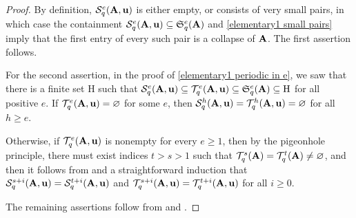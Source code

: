 \documentclass{article}
\begin{document}
\begin{proof}
By definition, $\mathcal{S}_{q}^e(\mathbf{A}, \mathbf{u})$ is either empty, or consists of very small pairs, in which case the containment $\mathcal{S}_{q}^e(\mathbf{A}, \mathbf{u}) \subseteq \mathfrak{S}_{q}^e(\mathbf{A})$ and    \ref{elementary1 small pairs} imply that the first entry of every such pair is a collapse of $\mathbf{A}$.   The first assertion follows.

For the second assertion, in the proof of \ref{elementary1 periodic in e}, we saw that there is a finite set $\mathrm{H}$ such that $\mathcal{S}_{q}^e(\mathbf{A}, \mathbf{u}) \subseteq \mathcal{T}_{q}^e(\mathbf{A}, \mathbf{u}) \subseteq \mathfrak{S}_{q}^e(\mathbf{A}) \subseteq \mathrm{H}$ for all positive $e$.  If $\mathcal{T}_{q}^e(\mathbf{A}, \mathbf{u}) = \varnothing$ for some $e$, then $\mathcal{S}_{q}^h(\mathbf{A}, \mathbf{u}) = \mathcal{T}_{q}^h(\mathbf{A}, \mathbf{u}) = \varnothing$ for all $h \geq e$.  

Otherwise, if $\mathcal{T}_{q}^e(\mathbf{A}, \mathbf{u})$ is nonempty for every $e \geq 1$, then by the pigeonhole principle, there must exist indices $t > s > 1$ such that $\mathcal{T}_{q}^s(\mathbf{A}) = \mathcal{T}_{q}^t(\mathbf{A}) \neq \varnothing$, and then it follows from  and a straightforward induction that $\mathcal{S}_{q}^{s+i}(\mathbf{A}, \mathbf{u}) = \mathcal{S}_{q}^{t+i}(\mathbf{A}, \mathbf{u})$ and  $\mathcal{T}_{q}^{s+i}(\mathbf{A}, \mathbf{u}) = \mathcal{T}_{q}^{t+i}(\mathbf{A}, \mathbf{u})$ for all $i \geq 0$.

The remaining assertions follow from  and .
\end{proof}
\end{document}
